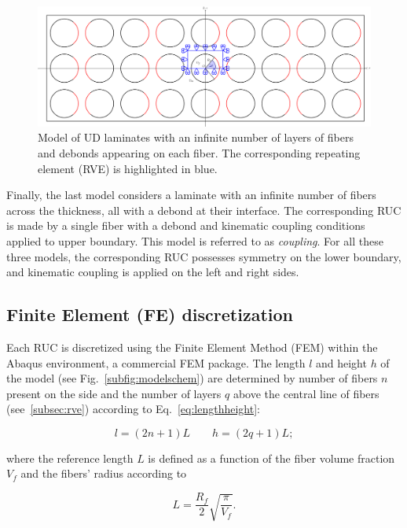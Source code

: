 \documentclass[review]{elsarticle}
\begin{document}
\begin{figure}[!h]
\centering
\includegraphics[width=\textwidth]{thickPlyAllDebonds.pdf}
\caption{Model of UD laminates with an infinite number of  layers of fibers and debonds appearing on each fiber. The corresponding repeating element (RVE) is highlighted in blue.}\label{fig:thickplyalldebonds}
\end{figure}

Finally, the last model considers a laminate with an infinite number of fibers across the thickness, all with a debond at their interface. The corresponding RUC is made by a single fiber with a debond and kinematic coupling conditions applied to upper boundary. This model is referred to as \textit{coupling}. For all these three models, the corresponding RUC possesses symmetry on the lower boundary, and kinematic coupling is applied on the left and right sides.

\subsection{Finite Element (FE) discretization}

Each RUC is discretized using the Finite Element Method (FEM) within the Abaqus environment, a commercial FEM package. The length $l$ and height $h$ of the model (see Fig.~\ref{subfig:modelschem}) are determined by number of fibers $n$ present on the side and the number of layers $q$ above the central line of fibers (see~\ref{subsec:rve}) according to Eq.~\ref{eq:lengthheight}:

\begin{equation}\label{eq:lengthheight}
l=\left(2n+1\right)L\qquad h=\left(2q+1\right)L;
\end{equation}

where the reference length $L$ is defined as a function of the fiber volume fraction $V_{f}$ and the fibers' radius according to

\begin{equation}\label{eq:LVf}
L=\frac{R_{f}}{2}\sqrt{\frac{\pi}{V_{f}}}.
\end{equation}
\end{document}
